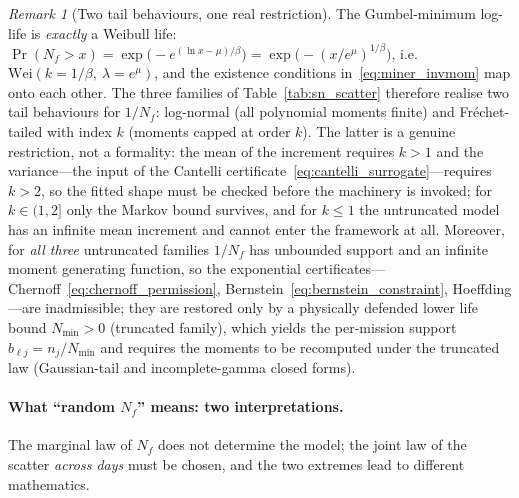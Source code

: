 \documentclass[11pt,a4paper]{article}
\theoremstyle{plain}
\theoremstyle{definition}
\theoremstyle{remark}
\newtheorem{remark}[theorem]{Remark}
\begin{document}
\begin{remark}[Two tail behaviours, one real restriction]\label{rem:miner_tails}
The Gumbel-minimum log-life is \emph{exactly} a Weibull life: $\Pr(N_f > x) = \exp\big(-e^{(\ln x - \mu)/\beta}\big) = \exp\big(-(x/e^{\mu})^{1/\beta}\big)$, i.e.\ $\mathrm{Wei}(k = 1/\beta,\ \lambda = e^{\mu})$, and the existence conditions in~\eqref{eq:miner_invmom} map onto each other.
The three families of Table~\ref{tab:sn_scatter} therefore realise two tail behaviours for $1/N_f$: log-normal (all polynomial moments finite) and Fr\'echet-tailed with index $k$ (moments capped at order $k$).
The latter is a genuine restriction, not a formality: the mean of the increment requires $k > 1$ and the variance---the input of the Cantelli certificate~\eqref{eq:cantelli_surrogate}---requires $k > 2$, so the fitted shape must be checked before the machinery is invoked; for $k \in (1,2]$ only the Markov bound survives, and for $k \le 1$ the untruncated model has an infinite mean increment and cannot enter the framework at all.
Moreover, for \emph{all three} untruncated families $1/N_f$ has unbounded support and an infinite moment generating function, so the exponential certificates---Chernoff~\eqref{eq:chernoff_permission}, Bernstein~\eqref{eq:bernstein_constraint}, Hoeffding---are inadmissible; they are restored only by a physically defended lower life bound $N_{\min} > 0$ (truncated family), which yields the per-mission support $b_{\ell j} = n_j / N_{\min}$ and requires the moments to be recomputed under the truncated law (Gaussian-tail and incomplete-gamma closed forms).
\end{remark}

\paragraph{What ``random $N_f$'' means: two interpretations.}
The marginal law of $N_f$ does not determine the model; the joint law of the scatter \emph{across days} must be chosen, and the two extremes lead to different mathematics.
\end{document}
